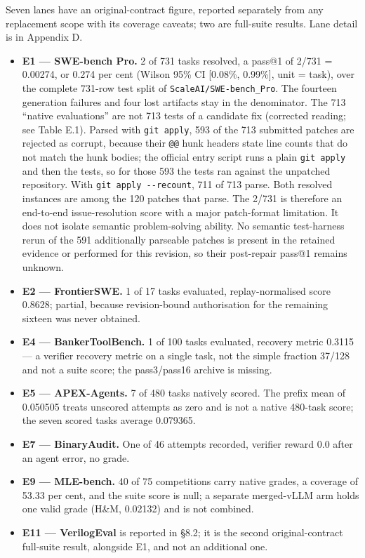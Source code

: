 \documentclass[12pt,a4paper]{report}
\providecommand{\tightlist}{%
  \setlength{\itemsep}{0pt}\setlength{\parskip}{0pt}}
\begin{document}
Seven lanes have an original-contract figure, reported separately from
any replacement scope with its coverage caveats; two are full-suite
results. Lane detail is in Appendix D.

\begin{itemize}
\tightlist
\item
  \textbf{E1 --- SWE-bench Pro.} 2 of 731 tasks resolved, a pass@1 of
  2/731 = 0.00274, or 0.274 per cent (Wilson 95\% CI {[}0.08\%,
  0.99\%{]}, unit = task), over the complete 731-row test split of
  \texttt{ScaleAI/SWE-bench\_Pro}. The fourteen generation failures and
  four lost artifacts stay in the denominator. The 713 ``native
  evaluations'' are not 713 tests of a candidate fix (corrected reading;
  see Table E.1). Parsed with \texttt{git\ apply}, 593 of the 713
  submitted patches are rejected as corrupt, because their \texttt{@@}
  hunk headers state line counts that do not match the hunk bodies; the
  official entry script runs a plain \texttt{git\ apply} and then the
  tests, so for those 593 the tests ran against the unpatched
  repository. With \texttt{git\ apply\ -\/-recount}, 711 of 713 parse.
  Both resolved instances are among the 120 patches that parse. The
  2/731 is therefore an end-to-end issue-resolution score with a major
  patch-format limitation. It does not isolate semantic problem-solving
  ability. No semantic test-harness rerun of the 591 additionally
  parseable patches is present in the retained evidence or performed for
  this revision, so their post-repair pass@1 remains unknown.
\item
  \textbf{E2 --- FrontierSWE.} 1 of 17 tasks evaluated,
  replay-normalised score 0.8628; partial, because revision-bound
  authorisation for the remaining sixteen was never obtained.
\item
  \textbf{E4 --- BankerToolBench.} 1 of 100 tasks evaluated, recovery
  metric 0.3115 --- a verifier recovery metric on a single task, not the
  simple fraction 37/128 and not a suite score; the pass3/pass16 archive
  is missing.
\item
  \textbf{E5 --- APEX-Agents.} 7 of 480 tasks natively scored. The
  prefix mean of 0.050505 treats unscored attempts as zero and is not a
  native 480-task score; the seven scored tasks average 0.079365.
\item
  \textbf{E7 --- BinaryAudit.} One of 46 attempts recorded, verifier
  reward 0.0 after an agent error, no grade.
\item
  \textbf{E9 --- MLE-bench.} 40 of 75 competitions carry native grades,
  a coverage of 53.33 per cent, and the suite score is null; a separate
  merged-vLLM arm holds one valid grade (H\&M, 0.02132) and is not
  combined.
\item
  \textbf{E11 --- VerilogEval} is reported in §8.2; it is the second
  original-contract full-suite result, alongside E1, and not an
  additional one.
\end{itemize}
\end{document}
